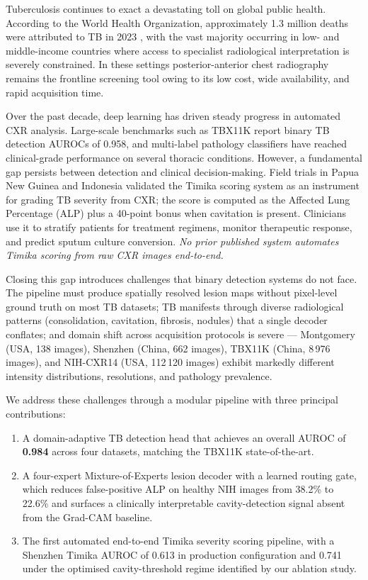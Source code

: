 \documentclass{article}
\begin{document}
Tuberculosis continues to exact a devastating toll on global public health. According to the World Health Organization, approximately 1.3 million deaths were attributed to TB in 2023 \cite{who2024tb}, with the vast majority occurring in low- and middle-income countries where access to specialist radiological interpretation is severely constrained. In these settings posterior-anterior chest radiography remains the frontline screening tool owing to its low cost, wide availability, and rapid acquisition time.

Over the past decade, deep learning has driven steady progress in automated CXR analysis. Large-scale benchmarks such as TBX11K \cite{liu2020tbx11k} report binary TB detection AUROCs of 0.958, and multi-label pathology classifiers \cite{cohen2022torchxrayvision} have reached clinical-grade performance on several thoracic conditions. However, a fundamental gap persists between detection and clinical decision-making. Field trials in Papua New Guinea and Indonesia validated the Timika scoring system \cite{ralph2013timika} as an instrument for grading TB severity from CXR; the score is computed as the Affected Lung Percentage (ALP) plus a 40-point bonus when cavitation is present. Clinicians use it to stratify patients for treatment regimens, monitor therapeutic response, and predict sputum culture conversion. \emph{No prior published system automates Timika scoring from raw CXR images end-to-end.}

Closing this gap introduces challenges that binary detection systems do not face. The pipeline must produce spatially resolved lesion maps without pixel-level ground truth on most TB datasets; TB manifests through diverse radiological patterns (consolidation, cavitation, fibrosis, nodules) that a single decoder conflates; and domain shift across acquisition protocols is severe --- Montgomery \cite{jaeger2014shenzhen} (USA, 138 images), Shenzhen \cite{jaeger2014shenzhen} (China, 662 images), TBX11K \cite{liu2020tbx11k} (China, 8\,976 images), and NIH-CXR14 \cite{wang2017nihcxr} (USA, 112\,120 images) exhibit markedly different intensity distributions, resolutions, and pathology prevalence.

We address these challenges through a modular pipeline with three principal contributions:

\begin{enumerate}
\item A domain-adaptive TB detection head that achieves an overall AUROC of \textbf{0.984} across four datasets, matching the TBX11K state-of-the-art.

\item A four-expert Mixture-of-Experts lesion decoder with a learned routing gate, which reduces false-positive ALP on healthy NIH images from 38.2\% to 22.6\% and surfaces a clinically interpretable cavity-detection signal absent from the Grad-CAM baseline.

\item The first automated end-to-end Timika severity scoring pipeline, with a Shenzhen Timika AUROC of 0.613 in production configuration and 0.741 under the optimised cavity-threshold regime identified by our ablation study.
\end{enumerate}
\end{document}

